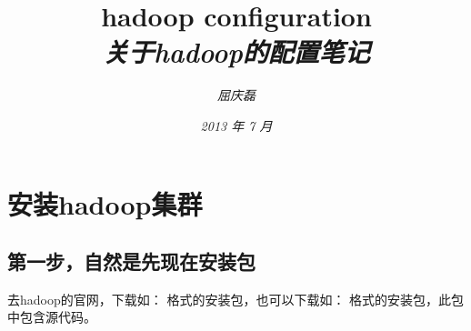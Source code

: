 \documentclass{article}
\begin{document}
\title{%
  {\huge \textsf{hadoop configuration}\\\smallskip}%
  {\small \textit{关于hadoop的配置笔记}}
}

\author{\textit{屈庆磊}\\[2mm]
       }

\date{\textit{2013 年 7 月}}

\maketitle
\newpage
\begin{multicols}{2}
\tableofcontents
\end{multicols}
\newpage 

\section{安装hadoop集群}
\subsection{第一步，自然是先现在安装包}
去hadoop的官网，下载如： 格式的安装包，也可以下载如：
格式的安装包，此包中包含源代码。
\end{document}
